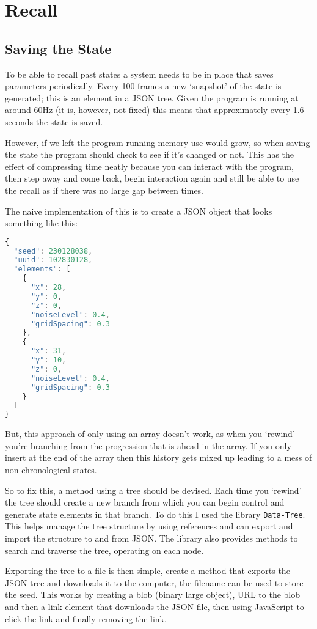 \chapter{Recall}
\section{Saving the State}
To be able to recall past states a system needs to be in place that saves
parameters periodically. Every 100 frames a new `snapshot' of the state is
generated; this is an element in a JSON tree. Given the program is running at
around 60Hz (it is, however, not fixed) this means that approximately every 1.6
seconds the state is saved.

However, if we left the program running memory use would grow, so when saving
the state the program should check to see if it's changed or not. This has the
effect of compressing time neatly because you can interact with the program,
then step away and come back, begin interaction again and still be able to use
the recall as if there was no large gap between times.

The naive implementation of this is to create a JSON object that looks something
like this:

\begin{lstlisting}[language=javascript]
{
  "seed": 230128038,
  "uuid": 102830128,
  "elements": [
    {
      "x": 28,
      "y": 0,
      "z": 0,
      "noiseLevel": 0.4,
      "gridSpacing": 0.3
    },
    {
      "x": 31,
      "y": 10,
      "z": 0,
      "noiseLevel": 0.4,
      "gridSpacing": 0.3
    }
  ]
}
\end{lstlisting}

But, this approach of only using an array doesn't work, as when you `rewind'
you're branching from the progression that is ahead in the array. If
you only insert at the end of the array then this history gets mixed up leading
to a mess of non-chronological states.

So to fix this, a method using a tree should be devised. Each time you `rewind'
the tree should create a new branch from which you can begin control and
generate state elements in that branch. To do this I used the library 
\verb|Data-Tree|. This helps manage the tree structure by using references and
can export and import the structure to and from JSON. The library also provides
methods to search and traverse the tree, operating on each node.

Exporting the tree to a file is then simple, create a method that exports the
JSON tree and downloads it to the computer, the filename can be used to store
the seed. This works by creating a blob (binary large object), URL to the blob
and then a link element that downloads the JSON file, then using JavaScript to
click the link and finally removing the link.

